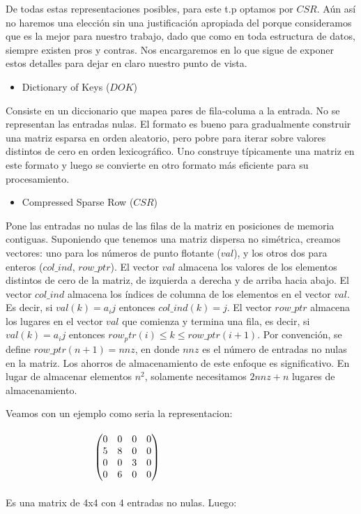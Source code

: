 De todas estas representaciones posibles, para este t.p optamos por $CSR$. Aún así no haremos una elección sin una justificación apropiada del porque consideramos que es la mejor para nuestro trabajo, dado que como en toda estructura de datos, siempre existen pros y contras. Nos encargaremos en lo que sigue de exponer estos detalles para dejar en claro nuestro punto de vista. 

\begin{itemize}
\item Dictionary of Keys ($DOK$)
\end{itemize}
Consiste en un diccionario que mapea pares de fila-columa a la entrada. No se representan las entradas nulas. El formato es bueno para gradualmente construir una matriz esparsa en orden aleatorio, pero pobre para iterar sobre valores distintos de cero en orden lexicográfico. Uno construye típicamente una matriz en este formato y luego se convierte en otro formato más eficiente para su procesamiento.

\begin{itemize}
\item Compressed Sparse Row ($CSR$)
\end{itemize}
Pone las entradas no nulas de las filas de la matriz en posiciones de memoria contiguas. Suponiendo que tenemos una matriz dispersa no simétrica, creamos vectores: uno para los números de punto flotante ($val$), y los otros dos para enteros ($col\_ind$, $row\_ptr$). El vector $val$ almacena los valores de los elementos distintos de cero de la matriz, de izquierda a derecha y de arriba hacia abajo. El vector $col\_ind$ almacena los índices de columna de los elementos en el vector $val$. Es decir, si $val(k) = a_ij$ entonces $col\_ind(k) = j$. El vector $row\_ptr$ almacena los lugares en el vector $val$ que comienza y termina una fila, es decir, si $val(k) = a_ij$ entonces $row_ptr(i) \leq k \leq row\_ptr(i+1)$. Por convención, se define $row\_ptr(n+1) = nnz$, en donde $nnz$ es el número de entradas no nulas en la matriz. Los ahorros de almacenamiento de este enfoque es significativo. En lugar de almacenar elementos $n^2$, solamente necesitamos $2nnz + n$ lugares de almacenamiento.

Veamos con un ejemplo como seria la representacion:
\\\\
$\hspace{3.2cm}\begin{pmatrix} 0 & 0 & 0 & 0 \\ 5 & 8 & 0 & 0 \\ 0 & 0 & 3 & 0 \\ 0 & 6 & 0 & 0 \\ \end{pmatrix}$
\\\\
Es una matrix de 4x4 con 4 entradas no nulas. Luego:\\
   
